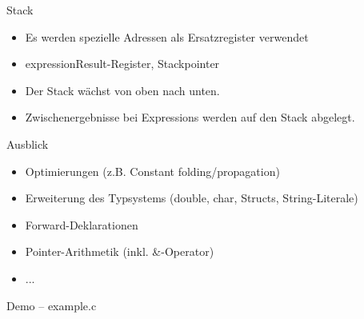 \documentclass{beamer}
\begin{document}
\begin{frame}{Stack}
\begin{itemize}
	\item Es werden spezielle Adressen als Ersatzregister verwendet
	\item expressionResult-Register, Stackpointer
	\item Der Stack wächst von oben nach unten.
	\item Zwischenergebnisse bei Expressions werden auf den Stack abgelegt.
\end{itemize}
\end{frame}

\begin{frame}{Ausblick}
\begin{itemize}
	\item Optimierungen (z.B. Constant folding/propagation)
	\item Erweiterung des Typsystems (double, char, Structs, String-Literale)
	\item Forward-Deklarationen
	\item Pointer-Arithmetik (inkl. \&-Operator)
	\item ...
\end{itemize}
\end{frame}

\begin{frame}{Demo -- example.c}
\end{frame}
\end{document}

